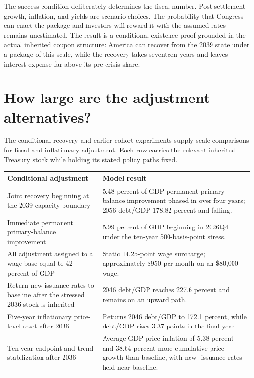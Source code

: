 \documentclass[11pt]{article}
\begin{document}
The success condition deliberately determines the fiscal number.  Post-settlement growth,
inflation, and yields are scenario choices.  The probability that Congress can enact the
package and investors will reward it with the assumed rates remains unestimated.  The
result is a conditional existence proof grounded in the actual inherited coupon structure:
America can recover from the 2039 state under a package of this scale, while the recovery
takes seventeen years and leaves interest expense far above its pre-crisis share.

\section{How large are the adjustment alternatives?}

The conditional recovery and earlier cohort experiments supply scale comparisons for fiscal
and inflationary adjustment.  Each row carries the relevant inherited Treasury stock while
holding its stated policy paths fixed.

\begin{center}
\small
\setlength{\tabcolsep}{5pt}
\renewcommand{\arraystretch}{1.08}
\begin{tabularx}{\textwidth}{>{\raggedright\arraybackslash}p{}Y}
\toprule
Conditional adjustment & Model result \\
\midrule
Joint recovery beginning at the 2039 capacity boundary & 5.48-percent-of-GDP permanent
primary-balance improvement phased in over four years; 2056 debt/GDP 178.82 percent and
falling. \\
\addlinespace
Immediate permanent primary-balance improvement & 5.99 percent of GDP beginning in
2026Q4 under the ten-year 500-basis-point stress. \\
\addlinespace
All adjustment assigned to a wage base equal to 42 percent of GDP & Static 14.25-point wage
surcharge; approximately \$950 per month on an \$80,000 wage. \\
\addlinespace
Return new-issuance rates to baseline after the stressed 2036 stock is inherited & 2046
debt/GDP reaches 227.6 percent and remains on an upward path. \\
\addlinespace
Five-year inflationary price-level reset after 2036 & Returns 2046 debt/GDP to 172.1 percent,
while debt/GDP rises 3.37 points in the final year. \\
\addlinespace
Ten-year endpoint and trend stabilization after 2036 & Average GDP-price inflation
of 5.38 percent and 38.64 percent more cumulative price growth than baseline, with new-
issuance rates held near baseline. \\
\bottomrule
\end{tabularx}
\end{center}
\end{document}
